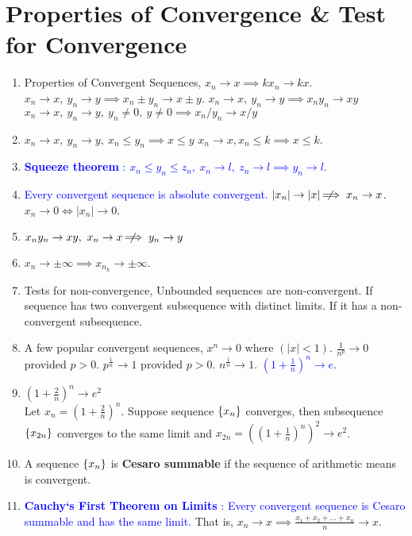 \section{Properties of Convergence \& Test for Convergence}
\begin{enumerate}
	\item Properties of Convergent Sequences,
		\subitem $x_n \to x \implies kx_n \to kx$.
		\subitem $x_n \to x,\ y_n \to y \implies x_n \pm y_n \to x \pm y$.
		\subitem $x_n \to x,\ y_n \to y \implies x_n y_n \to xy$
		\subitem $x_n \to x,\ y_n \to y,\ y_n \ne 0,\ y \ne 0 \implies x_n/y_n \to x/y$ 
	\item $x_n \to x,\ y_n \to y,\ x_n \le y_n \implies x \le y$
		\subitem $x_n \to x, x_n \le k \implies x \le k$.
	\item \textcolor{blue}{\textbf{Squeeze theorem} : $x_n \le y_n \le z_n,\ x_n \to l,\ z_n \to l \implies y_n \to l$.}
	\item \textcolor{blue}{Every convergent sequence is absolute convergent.}
	\subitem $|x_n| \to |x| \;\not\nobreak\!\!\!\!\implies x_n \to x$.
	\subitem $x_n \to 0 \iff |x_n| \to 0$.
	\item $x_ny_n \to xy, \ x_n \to x \;\not\nobreak\!\!\!\!\implies y_n \to y$
	\item $x_n \to \pm \infty \implies x_{n_k} \to \pm \infty$.
	\item Tests for non-convergence,
		\subitem Unbounded sequences are non-convergent.
		\subitem If sequence has two convergent subsequence with distinct limits.
		\subitem If it has a non-convergent subsequence.
	\item A few popular convergent sequences,
		\subitem $x^n \to 0$ where $(|x| < 1)$.
		\subitem $\frac{1}{n^p} \to 0$ provided $p > 0$.
		\subitem $p^\frac{1}{n} \to 1$ provided $p > 0$.
		\subitem $n^\frac{1}{n} \to 1$.
		\subitem \textcolor{blue}{$(1+\frac{1}{n})^n \to e$.}
	\item $(1+\frac{2}{n})^n \to e^2$\\
		Let $x_n = (1+\frac{2}{n})^n$. Suppose sequence $\{x_n\}$ converges, then subsequence $\{x_{2n}\}$ converges to the same limit and $x_{2n} = \left((1+\frac{1}{n})^n\right)^2 \to e^2$.
	\item A sequence $\{x_n\}$ is \textbf{Cesaro summable} if the sequence of arithmetic means is convergent.
\item \textcolor{blue}{\textbf{Cauchy`s First Theorem on Limits} : Every convergent sequence is Cesaro summable and has the same limit.} That is, $x_n \to x \implies \frac{x_1+x_2+\dots+x_n}{n} \to x$.

\end{enumerate}
